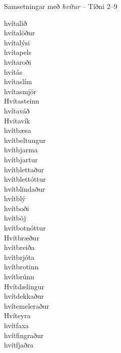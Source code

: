 \documentclass[../samsetningasafn.tex]{subfiles}
\begin{document}
\begin{bigwordlist}
\label{listi:svart9}
\caption{Samsetningar með \textit{hvítur} -- Tíðni 2--9}
\end{bigwordlist}


\begin{bigwordlist}
\begin{footnotesize}
\begin{multicols}{4}
	\begin{description}
		\item [hvítalið]
		\item [hvítalöður]
		\item [hvítalýsi]
		\item [hvítapels]
		\item [hvítaroði]
		\item [hvítás]
		\item [hvítaslím]
		\item [hvítasmjör]
		\item [Hvítasteinn]
		\item [hvítaváð]
		\item [Hvítavík]
		\item [hvítbæsa]
		\item [hvítbeltungur]
		\item [hvítbjarma]
		\item [hvítbjartur]
		\item [hvítblettaður]
		\item [hvítblettóttur]
		\item [hvítblindaður]
		\item [hvítblý]
		\item [hvítboði]
		\item [hvítböj]
		\item [hvítbotnóttur]
		\item [Hvítbræður]
		\item [hvítbreiða]
		\item [hvítbrjóta]
		\item [hvítbrotinn]
		\item [hvítbrúnn]
		\item [Hvítdælingur]
		\item [hvítdekkaður]
		\item [hvítemeleraður]
		\item [Hvíteyra]
		\item [hvítfaxa]
		\item [hvítfingraður]
		\item [hvítfjaðra]

\end{description}
\end{multicols}
\end{footnotesize}
\end{bigwordlist}
\end{document}

